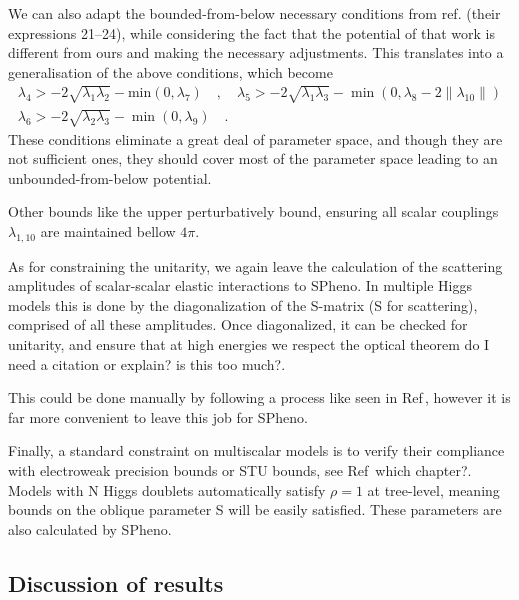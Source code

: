 We can also adapt the bounded-from-below necessary conditions from ref. \cite{Moretti_2015} (their expressions 21–24), while considering the fact that the potential of that work is different from ours and making the necessary adjustments. 
%
This translates into a generalisation of the above conditions, which become
%
\begin{equation}
\begin{gathered}
\lambda_4 > - 2 \sqrt{\lambda_1 \lambda_2} - \text{min}(0,\lambda_7) \quad , \quad  \lambda_5 > -2 \sqrt{\lambda_1 \lambda_3} - \min(0,\lambda_8 - 2\|\lambda_{10}\|)  \\
\lambda_6 > - 2 \sqrt{\lambda_2 \lambda_3} - \min(0,\lambda_9) \quad . 
\end{gathered} 
\end{equation}
%
These conditions eliminate a great deal of parameter space, and though they are not sufficient ones, they should cover most of the parameter space leading to an unbounded-from-below potential.

Other bounds like the upper perturbatively bound, ensuring all scalar couplings $\lambda_{1,10}$ are maintained bellow $4\pi$.

As for constraining the unitarity, we again leave the calculation of the scattering amplitudes of scalar-scalar elastic interactions to SPheno. 
%
In multiple Higgs models this is done by the diagonalization of the S-matrix (S for scattering), comprised of all these amplitudes.
%
Once diagonalized, it can be checked for unitarity, and ensure that at high energies we respect the optical theorem {\color{red} do I need a citation or explain? is this too much?}. 

This could be done manually by following a process like seen in Ref\,\cite{Moretti_2015}, however it is far more convenient to leave this job for SPheno. 

Finally, a standard constraint on multiscalar models is to verify their compliance with electroweak precision bounds or STU bounds, see Ref\,\cite{Peskin1992} { \color{red} which chapter?}. 
% 
Models with N Higgs doublets automatically satisfy $\rho = 1$ at tree-level, meaning bounds on the oblique parameter S will be easily satisfied. These parameters are also calculated by SPheno. 

%

\subsection{Discussion of results}

